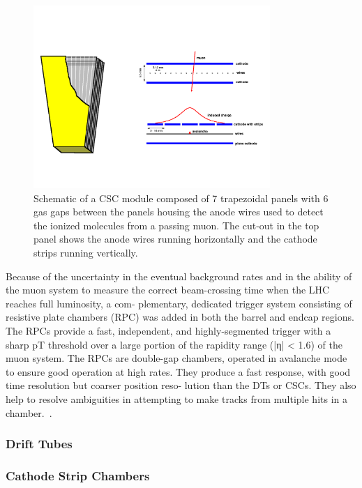 \begin{figure}[htbp]
\centering
     \includegraphics[width=0.8\textwidth]{cms_and_lhc/plots/cms_muon_csc2.pdf}
     \caption{
Schematic of a CSC module composed of 7 trapezoidal panels with 6 gas gaps between
the panels housing the anode wires used to detect the ionized molecules from a passing
muon. The cut-out in the top panel shows the anode wires running horizontally and 
the cathode strips running vertically.
     }
     \label{fig:cms_muon_csc}
\end{figure}


Because of the uncertainty in the eventual background rates and in the ability of the muon system to measure the correct beam-crossing time when the LHC reaches full luminosity, a com- plementary, dedicated trigger system consisting of resistive plate chambers (RPC) was added in both the barrel and endcap regions. The RPCs provide a fast, independent, and highly-segmented trigger with a sharp pT threshold over a large portion of the rapidity range (|η| < 1.6) of the muon system. The RPCs are double-gap chambers, operated in avalanche mode to ensure good operation at high rates. They produce a fast response, with good time resolution but coarser position reso- lution than the DTs or CSCs. They also help to resolve ambiguities in attempting to make tracks from multiple hits in a chamber.~\cite{1748-0221-8-03-T03001}.



\subsubsection{Drift Tubes}
\subsubsection{Cathode Strip Chambers}
